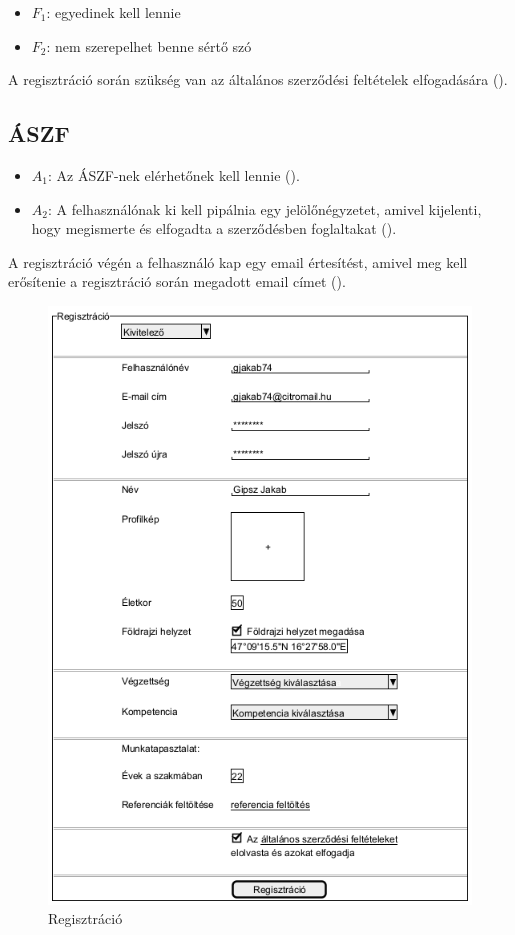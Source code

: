 \begin{itemize}
    \item $F_1$: egyedinek kell lennie
    \item $F_2$: nem szerepelhet benne sértő szó
\end{itemize}

A regisztráció során szükség van az általános szerződési feltételek elfogadására ().

\subsection{ÁSZF}

\begin{itemize}
    \item $A_1$: Az ÁSZF-nek elérhetőnek kell lennie ().
    \item $A_2$: A felhasználónak ki kell pipálnia egy jelölőnégyzetet, amivel kijelenti, hogy megismerte és elfogadta a szerződésben foglaltakat ().
\end{itemize}

A regisztráció végén a felhasználó kap egy email értesítést, amivel meg kell erősítenie a regisztráció során megadott email címet ().

\begin{figure}[h]
	\centering
	\includegraphics[scale=0.5]{img/regisztracio.png}
	\caption{Regisztráció}
	\label{fig:reg}
\end{figure}